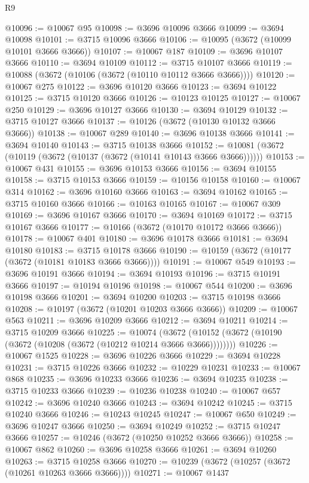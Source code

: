 \begin{lexlean}{R9}
\begin{coremodule}
@10096 := @10067 @95
@10098 := @3696 @10096 @3666
@10099 := @3694 @10098
@10101 := @3715 @10096 @3666
@10106 := @10095 (@3672 (@10099 @10101 @3666 @3666))
@10107 := @10067 @187
@10109 := @3696 @10107 @3666
@10110 := @3694 @10109
@10112 := @3715 @10107 @3666
@10119 := @10088 (@3672 (@10106 (@3672 (@10110 @10112 @3666 @3666))))
@10120 := @10067 @275
@10122 := @3696 @10120 @3666
@10123 := @3694 @10122
@10125 := @3715 @10120 @3666
@10126 := @10123 @10125
@10127 := @10067 @250
@10129 := @3696 @10127 @3666
@10130 := @3694 @10129
@10132 := @3715 @10127 @3666
@10137 := @10126 (@3672 (@10130 @10132 @3666 @3666))
@10138 := @10067 @289
@10140 := @3696 @10138 @3666
@10141 := @3694 @10140
@10143 := @3715 @10138 @3666
@10152 := @10081 (@3672 (@10119 (@3672 (@10137 (@3672 (@10141 @10143 @3666 @3666))))))
@10153 := @10067 @431
@10155 := @3696 @10153 @3666
@10156 := @3694 @10155
@10158 := @3715 @10153 @3666
@10159 := @10156 @10158
@10160 := @10067 @314
@10162 := @3696 @10160 @3666
@10163 := @3694 @10162
@10165 := @3715 @10160 @3666
@10166 := @10163 @10165
@10167 := @10067 @309
@10169 := @3696 @10167 @3666
@10170 := @3694 @10169
@10172 := @3715 @10167 @3666
@10177 := @10166 (@3672 (@10170 @10172 @3666 @3666))
@10178 := @10067 @401
@10180 := @3696 @10178 @3666
@10181 := @3694 @10180
@10183 := @3715 @10178 @3666
@10190 := @10159 (@3672 (@10177 (@3672 (@10181 @10183 @3666 @3666))))
@10191 := @10067 @549
@10193 := @3696 @10191 @3666
@10194 := @3694 @10193
@10196 := @3715 @10191 @3666
@10197 := @10194 @10196
@10198 := @10067 @544
@10200 := @3696 @10198 @3666
@10201 := @3694 @10200
@10203 := @3715 @10198 @3666
@10208 := @10197 (@3672 (@10201 @10203 @3666 @3666))
@10209 := @10067 @563
@10211 := @3696 @10209 @3666
@10212 := @3694 @10211
@10214 := @3715 @10209 @3666
@10225 := @10074
    (@3672 (@10152 (@3672 (@10190 (@3672 (@10208 (@3672 (@10212 @10214 @3666 @3666))))))))
@10226 := @10067 @1525
@10228 := @3696 @10226 @3666
@10229 := @3694 @10228
@10231 := @3715 @10226 @3666
@10232 := @10229 @10231
@10233 := @10067 @868
@10235 := @3696 @10233 @3666
@10236 := @3694 @10235
@10238 := @3715 @10233 @3666
@10239 := @10236 @10238
@10240 := @10067 @657
@10242 := @3696 @10240 @3666
@10243 := @3694 @10242
@10245 := @3715 @10240 @3666
@10246 := @10243 @10245
@10247 := @10067 @650
@10249 := @3696 @10247 @3666
@10250 := @3694 @10249
@10252 := @3715 @10247 @3666
@10257 := @10246 (@3672 (@10250 @10252 @3666 @3666))
@10258 := @10067 @862
@10260 := @3696 @10258 @3666
@10261 := @3694 @10260
@10263 := @3715 @10258 @3666
@10270 := @10239 (@3672 (@10257 (@3672 (@10261 @10263 @3666 @3666))))
@10271 := @10067 @1437

\end{coremodule}
\end{lexlean}
